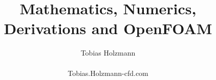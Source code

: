 
\newcommand{\cref}[1]{(\ref{#1})}
\newcommand{\rmm}{\mathrm}
\newcommand{\mr}{\mathrm}
\newcommand{\U}{\textbf{U}}
\newcommand{\bTau}{\boldsymbol \tau}
\newcommand{\bTauInco}{\boldsymbol \tau_\mathrm{inco}}
\newcommand{\X}{\raisebox{2pt}{$\chi$}}
\newcommand{\ct}{\cellcolor{gray!10}}
\newcommand{\ctt}{\cellcolor{gray!5}}
\newcommand{\SIMPLE}{\texttt{SIMPLE}\xspace}
\newcommand{\SIMPLEC}{\texttt{SIMPLEC}\xspace}
\newcommand{\SIMPLER}{\texttt{SIMPLER}\xspace}
\newcommand{\SIMPLEM}{\texttt{SIMPLEM}\xspace}
\newcommand{\PISO}{\texttt{PISO}\xspace}
\newcommand{\PIMPLE}{\texttt{PIMPLE}\xspace}
\renewcommand{\textregistered}{\textsuperscript{\circledR}}
\newcommand\numberthis{\addtocounter{equation}{1}\tag{\theequation}}
\newcommand{\tr}{^T}
\newcommand{\D}{\mathrm{D}}
\newcommand{\Co}{\mathrm{Co}}
\newcommand{\vA}{\textbf{a}}
\newcommand{\vB}{\textbf{b}}
\newcommand{\vU}{\textbf{U}}
\newcommand{\tT}{\textbf{T}}
\newcommand{\OF}{OpenFOAM\textregistered\xspace}
\newcommand{\OFV}{7.x\xspace}
\newcommand{\DEV}{(23fb1cc)\xspace}
\newcommand{\red}{\color{red}}



\setlength{\intextsep}{22pt}
\setlength{\abovecaptionskip}{22pt}

\title{
  Mathematics, Numerics, Derivations and \OF
}


\author{
    Tobias Holzmann \\ ~ \\ Tobias.Holzmann\@Holzmann-cfd.com
}


